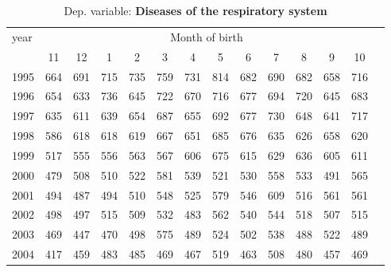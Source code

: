  \begin{table}[H] \begin{threeparttable} \centering \caption{Dep. variable: \textbf{Diseases of the respiratory system}} {\def\sym#1{\ifmmode^{#1}\else\(^{#1}\)\fi} \begin{tabular}{l*{13}{c}} \toprule year & \multicolumn{12}{c}{Month of birth} \\ \cmidrule(lr){2-13} 
            &          11&          12&           1&           2&           3&           4&           5&           6&           7&           8&           9&          10\\
1995        &         664&         691&         715&         735&         759&         731&         814&         682&         690&         682&         658&         716\\
1996        &         654&         633&         736&         645&         722&         670&         716&         677&         694&         720&         645&         683\\
1997        &         635&         611&         639&         654&         687&         655&         692&         677&         730&         648&         641&         717\\
1998        &         586&         618&         618&         619&         667&         651&         685&         676&         635&         626&         658&         620\\
1999        &         517&         555&         556&         563&         567&         606&         675&         615&         629&         636&         605&         611\\
2000        &         479&         508&         510&         522&         581&         539&         521&         530&         558&         533&         491&         565\\
2001        &         494&         487&         494&         510&         548&         525&         579&         546&         609&         516&         561&         561\\
2002        &         498&         497&         515&         509&         532&         483&         562&         540&         544&         518&         507&         515\\
2003        &         469&         447&         470&         498&         575&         489&         524&         502&         538&         488&         522&         489\\
2004        &         417&         459&         483&         485&         469&         467&         519&         463&         508&         480&         457&         469\\

\end{tabular}}
\end{threeparttable}
\end{table}
